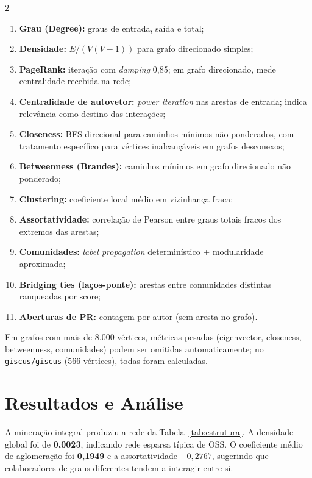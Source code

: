 \documentclass[12pt]{article}
\begin{document}
\begin{multicols}{2}
\begin{enumerate}[label=\arabic*., nosep]
  \item \textbf{Grau (Degree):} graus de entrada, saída e total;
  \item \textbf{Densidade:} $E / (V(V-1))$ para grafo direcionado simples;
  \item \textbf{PageRank:} iteração com \textit{damping} 0,85; em grafo direcionado, mede centralidade recebida na rede;
  \item \textbf{Centralidade de autovetor:} \textit{power iteration} nas arestas de entrada; indica relevância como destino das interações;
  \item \textbf{Closeness:} BFS direcional para caminhos mínimos não ponderados, com tratamento específico para vértices inalcançáveis em grafos desconexos;
  \item \textbf{Betweenness (Brandes):} caminhos mínimos em grafo direcionado não ponderado;
  \item \textbf{Clustering:} coeficiente local médio em vizinhança fraca;
  \item \textbf{Assortatividade:} correlação de Pearson entre graus totais fracos dos extremos das arestas;
  \item \textbf{Comunidades:} \textit{label propagation} determinístico + modularidade aproximada;
  \item \textbf{Bridging ties (laços-ponte):} arestas entre comunidades distintas ranqueadas por score;
  \item \textbf{Aberturas de PR:} contagem por autor (sem aresta no grafo).
\end{enumerate}
\end{multicols}

Em grafos com mais de 8.000 vértices, métricas pesadas (eigenvector, closeness, betweenness, comunidades) podem ser omitidas automaticamente; no \texttt{giscus/giscus} (566 vértices), todas foram calculadas.

\section{Resultados e Análise}
\label{sec:resultados}

A mineração integral produziu a rede da Tabela~\ref{tab:estrutura}. A densidade global foi de \textbf{0,0023}, indicando rede esparsa típica de OSS. O coeficiente médio de aglomeração foi \textbf{0,1949} e a assortatividade \textbf{$-0{,}2767$}, sugerindo que colaboradores de graus diferentes tendem a interagir entre si.
\end{document}
